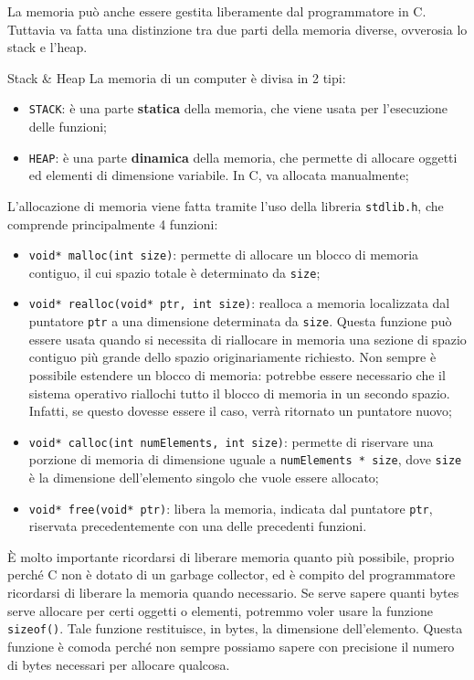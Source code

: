 La memoria può anche essere gestita liberamente dal programmatore in C. Tuttavia va fatta una distinzione tra due parti della memoria diverse, ovverosia lo stack e l'heap.

\begin{definition}{Stack \& Heap}
    La memoria di un computer è divisa in 2 tipi:
    \begin{itemize}
        \item \verb|STACK|: è una parte \textbf{statica} della memoria, che viene usata per l'esecuzione delle funzioni;
        \item \verb|HEAP|: è una parte \textbf{dinamica} della memoria, che permette di allocare oggetti ed elementi di dimensione variabile. In C, va allocata manualmente;
    \end{itemize}
\end{definition}

L'allocazione di memoria viene fatta tramite l'uso della libreria \verb|stdlib.h|, che comprende principalmente 4 funzioni:
\begin{itemize}
    \item \verb|void* malloc(int size)|: permette di allocare un blocco di memoria contiguo, il cui spazio totale è determinato da \verb|size|;
    \item \verb|void* realloc(void* ptr, int size)|: realloca a memoria localizzata dal puntatore \verb|ptr| a una dimensione determinata da \verb|size|. Questa funzione può essere usata quando si necessita di riallocare in memoria una sezione di spazio contiguo più grande dello spazio originariamente richiesto. Non sempre è possibile estendere un blocco di memoria: potrebbe essere necessario che il sistema operativo riallochi tutto il blocco di memoria in un secondo spazio. Infatti, se questo dovesse essere il caso, verrà ritornato un puntatore nuovo;
    \item \verb|void* calloc(int numElements, int size)|: permette di riservare una porzione di memoria di dimensione uguale a \verb|numElements * size|, dove \verb|size| è la dimensione dell'elemento singolo che vuole essere allocato;
    \item \verb|void* free(void* ptr)|: libera la memoria, indicata dal puntatore \verb|ptr|, riservata precedentemente con una delle precedenti funzioni.
\end{itemize}

È molto importante ricordarsi di liberare memoria quanto più possibile, proprio perché C non è dotato di un garbage collector, ed è compito del programmatore ricordarsi di liberare la memoria quando necessario.
\nwl
Se serve sapere quanti bytes serve allocare per certi oggetti o elementi, potremmo voler usare la funzione \verb|sizeof()|. Tale funzione restituisce, in bytes, la dimensione dell'elemento. Questa funzione è comoda perché non sempre possiamo sapere con precisione il numero di bytes necessari per allocare qualcosa.